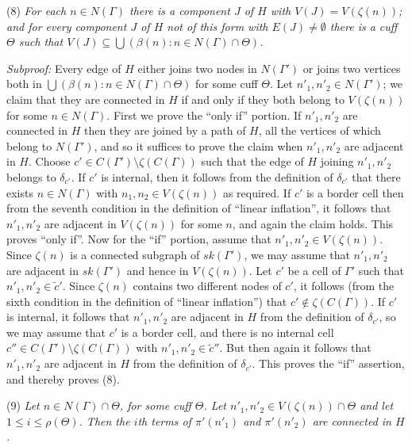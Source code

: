 \hspace*{12pt}(8) \textit{For each $n \in N(\Gamma)$ there is a component $J$ of $H$ with $V(J) = V(\zeta(n))$; and for every component $J$ of $H$ not of this form with $E(J) \ne \emptyset$ there is a cuff $\Theta$ such that $V(J) \subseteq \bigcup (\beta(n) : n \in N(\Gamma) \cap \Theta)$.}

\textit{Subproof:} Every edge of $H$ either joins two nodes in $N(\Gamma')$ or joins two vertices both in $\bigcup (\beta(n) : n \in N(\Gamma) \cap \Theta)$ for some cuff $\Theta$. Let $n'_1, n'_2 \in N(\Gamma')$; we claim that they are connected in $H$ if and only if they both belong to $V(\zeta(n))$ for some $n \in N(\Gamma)$. First we prove the ``only if'' portion. If $n'_1, n'_2$ are connected in $H$ then they are joined by a path of $H$, all the vertices of which belong to $N(\Gamma')$, and so it suffices to prove the claim when $n'_1, n'_2$ are adjacent in $H$. Choose $c' \in C(\Gamma') \setminus \zeta(C(\Gamma))$ such that the edge of $H$ joining $n'_1, n'_2$ belongs to $\delta_{c'}$. If $c'$ is internal, then it follows from the definition of $\delta_{c'}$ that there exists $n \in N(\Gamma)$ with $n_1, n_2 \in V(\zeta(n))$ as required. If $c'$ is a border cell then from the seventh condition in the definition of ``linear inflation'', it follows that $n'_1, n'_2$ are adjacent in $V(\zeta(n))$ for some $n$, and again the claim holds. This proves ``only if''. Now for the ``if'' portion, assume that $n'_1, n'_2 \in V(\zeta(n))$. Since $\zeta(n)$ is a connected subgraph of $sk(\Gamma')$, we may assume that $n'_1, n'_2$ are adjacent in $sk(\Gamma')$ and hence in $V(\zeta(n))$. Let $c'$ be a cell of $\Gamma'$ such that $n'_1, n'_2 \in \tilde{c}'$. Since $\zeta(n)$ contains two different nodes of $c'$, it follows (from the sixth condition in the definition of ``linear inflation'') that $c' \notin \zeta(C(\Gamma))$. If $c'$ is internal, it follows that $n'_1, n'_2$ are adjacent in $H$ from the definition of $\delta_{c'}$, so we may assume that $c'$ is a border cell, and there is no internal cell $c'' \in C(\Gamma') \setminus \zeta(C(\Gamma))$ with $n'_1, n'_2 \in \tilde{c}''$. But then again it follows that $n'_1, n'_2$ are adjacent in $H$ from the definition of $\delta_{c'}$. This proves the ``if'' assertion, and thereby proves (8).

\hspace*{12pt}(9) \textit{Let $n \in N(\Gamma) \cap \Theta$, for some cuff $\Theta$. Let $n'_1, n'_2 \in V(\zeta(n)) \cap \Theta$ and let $1 \le i \le \rho(\Theta)$. Then the $i$th terms of $\pi'(n'_1)$ and $\pi'(n'_2)$ are connected in $H$.}


